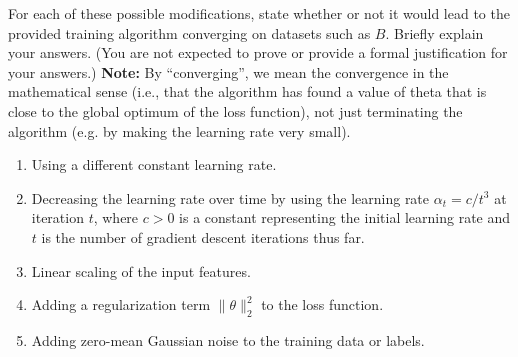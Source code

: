 \item {}
For each of these possible modifications, state whether or not it would lead to
the provided training algorithm converging
on datasets such as $B$. Briefly explain your answers. (You are not expected to prove or provide a formal justification for your answers.)
\textbf{Note:} By ``converging'', we mean the convergence in the mathematical sense (i.e., that the algorithm has found a value of theta that is close to the global optimum of the loss function), not just terminating the algorithm (e.g. by making the learning rate very small).
\begin{enumerate}
  \item Using a different constant learning rate.
  \item Decreasing the learning rate over time by using the learning rate $\alpha_{t}=c/t^{3}$ at iteration $t$, where $c>0$ is a constant representing the initial learning rate and $t$ is the number of gradient descent iterations thus far.
  \item Linear scaling of the input features.
  \item Adding a regularization term $\|\theta\|_2^2$ to the loss function.
  \item Adding zero-mean Gaussian noise to the training data or labels.
\end{enumerate}
 

